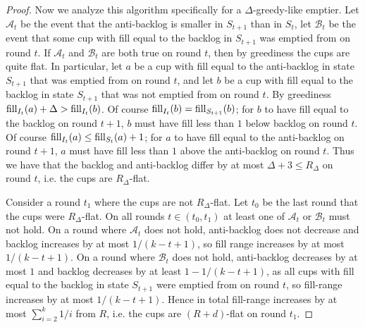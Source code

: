 \begin{proof}
  Now we analyze this algorithm specifically for a
  $\Delta$-greedy-like emptier. 
  Let $\mathcal{A}_t$ be the event that the
  anti-backlog is smaller in $S_{t+1}$ than in $S_t$, let
  $\mathcal{B}_t$ be the event that some cup with fill equal to
  the backlog in $S_{t+1}$ was emptied from on round $t$. If
  $\mathcal{A}_t$ and $\mathcal{B}_t$ are both true on round $t$,
  then by greediness the cups are quite flat. In particular, 
  let $a$ be a cup with fill equal to the anti-backlog in state
  $S_{t+1}$ that was emptied from on round $t$, and let $b$ be
  a cup with fill equal to the backlog in state $S_{t+1}$ that
  was not emptied from on round $t$. By greediness $\operatorname{\text{\textup{fill}}}_{I_t}(a) + \Delta
  > \operatorname{\text{\textup{fill}}}_{I_t}(b)$. Of course $\operatorname{\text{\textup{fill}}}_{I_t}(b) =
  \operatorname{\text{\textup{fill}}}_{S_{t+1}}(b)$; for $b$ to have fill equal to the backlog
  on round $t+1$, $b$ must have fill less than $1$ below 
  backlog on round $t$. Of course $\operatorname{\text{\textup{fill}}}_{I_t}(a) \le
  \operatorname{\text{\textup{fill}}}_{S_t}(a) + 1$; for $a$ to have fill equal to the
  anti-backlog on round $t+1$, $a$ must have fill less than $1$
  above the anti-backlog on round $t$. Thus we have that the
  backlog and anti-backlog differ by at most $\Delta + 3 \le
  R_\Delta$ on round $t$, i.e. the cups are $R_\Delta$-flat.

  Consider a round $t_1$ where the cups are not $R_\Delta$-flat.
  Let $t_0$ be the last round that the cups were $R_\Delta$-flat.
  On all rounds $t \in (t_0, t_1)$ at least one of
  $\mathcal{A}_t$ or $\mathcal{B}_t$ must not hold. On a round
  where $\mathcal{A}_t$ does not hold, anti-backlog does not
  decrease and backlog increases by at most $1/(k-t+1)$, so fill
  range increases by at most $1/(k-t+1).$ On a round where
  $\mathcal{B}_t$ does not hold, anti-backlog decreases by at
  most $1$ and backlog decreases by at least $1-1/(k-t+1)$, as
  all cups with fill equal to the backlog in state $S_{t+1}$ were
  emptied from on round $t$, so fill-range increases by at most
  $1/(k-t+1)$. 
  Hence in total fill-range increases by at most $\sum_{i=2}^k
  1/i$ from $R$, i.e. the cups are $(R+d)$-flat on round $t_1$.

\end{proof}
